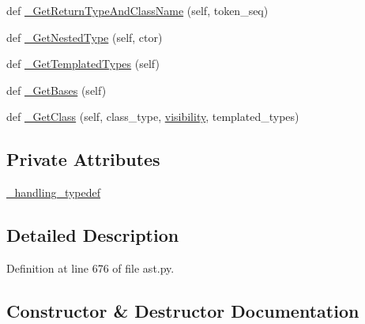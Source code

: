 \begin{DoxyCompactItemize}
\item 
def \hyperlink{classcpp_1_1ast_1_1AstBuilder_abef1c7f48a562a67507bd7ed6f822710}{\+\_\+\+Get\+Return\+Type\+And\+Class\+Name} (self, token\+\_\+seq)
\item 
def \hyperlink{classcpp_1_1ast_1_1AstBuilder_a5d691eeae461945d88601fc2f2dce3cb}{\+\_\+\+Get\+Nested\+Type} (self, ctor)
\item 
def \hyperlink{classcpp_1_1ast_1_1AstBuilder_a07d463f974a3a33de2840fc6965906c3}{\+\_\+\+Get\+Templated\+Types} (self)
\item 
def \hyperlink{classcpp_1_1ast_1_1AstBuilder_a5682851612e95587469f0c6d29d87e01}{\+\_\+\+Get\+Bases} (self)
\item 
def \hyperlink{classcpp_1_1ast_1_1AstBuilder_af5670e1181b5af00bce0acc0dd9d0da7}{\+\_\+\+Get\+Class} (self, class\+\_\+type, \hyperlink{classcpp_1_1ast_1_1AstBuilder_a2f16b19846c405101235432d2666b614}{visibility}, templated\+\_\+types)
\end{DoxyCompactItemize}
\subsection*{Private Attributes}
\begin{DoxyCompactItemize}
\item 
\hyperlink{classcpp_1_1ast_1_1AstBuilder_ac9daa2aa10bc58b5919d20203ff3b813}{\+\_\+handling\+\_\+typedef}
\end{DoxyCompactItemize}


\subsection{Detailed Description}


Definition at line 676 of file ast.\+py.



\subsection{Constructor \& Destructor Documentation}
\mbox{\label{classcpp_1_1ast_1_1AstBuilder_aaf35e2f9d395c99a38e6bb6f9b5dd047}} 
